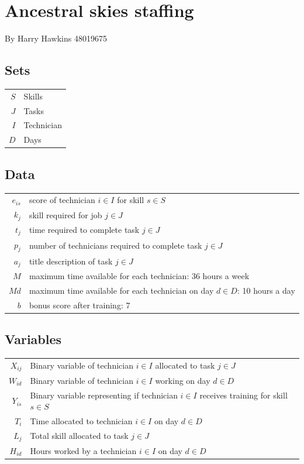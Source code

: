 \documentclass{article}
\begin{document}
	\section*{Ancestral skies staffing}
	By Harry Hawkins 48019675
	
	\subsection*{Sets}
	
	\begin{tabular}{rl}
		$S$ & Skills\\
		$J$ & Tasks\\
		$I$ & Technician\\
		$D$ & Days
	\end{tabular}

	\subsection*{Data}
	
	\begin{tabular}{rl}
		$e_{is}$ & score of technician $i\in I$ for skill $s\in S$\\
		$k_j$ & skill required for job $j\in J$\\
		$t_j$ & time required to complete task $j\in J$\\
		$p_j$ & number of technicians required to complete task $j\in J$\\
		$a_j$ & title description of task $j\in J$\\
		$M$ & maximum time available for each technician: 36 hours a week\\
		$Md$ & maximum time available for each technician on day $d\in D$: 10 hours a day\\
		$b$ & bonus score after training: 7


	\end{tabular}

	\subsection*{Variables}
	
	\begin{tabular}{rl}
		$X_{ij}$ & Binary variable of technician $i\in I$ allocated to task $j\in J$\\
		$W_{id}$ & Binary variable of technician $i\in I$ working on day $d\in D$\\
		$Y_{is}$ & Binary variable representing if technician $i\in I$ receives training for skill $s\in S$\\
		$T_i$ & Time allocated to technician $i\in I$ on day $d\in D$\\
		$L_j$ & Total skill allocated to task $j\in J$\\
		$H_{id}$ & Hours worked by a technician $i\in I$ on day $d\in D$\\
	\end{tabular}
\end{document}
